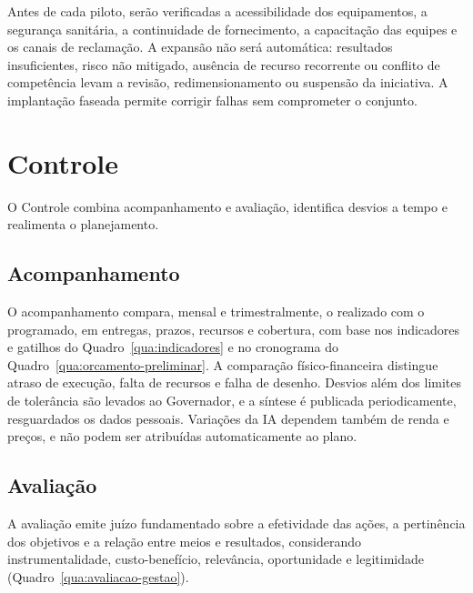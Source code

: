\documentclass[
	12pt,				%
	openright,			%
	oneside,			%
	a4paper,			%
	chapter=TITLE,		%
	section=TITLE,		%
	english,			%
	french,				%
	spanish,			%
	brazil,				%
 ]{abntex2}
\begin{document}
Antes de cada piloto, serão verificadas a acessibilidade dos equipamentos, a
segurança sanitária, a continuidade de fornecimento, a capacitação das equipes
e os canais de reclamação. A expansão não será automática: resultados
insuficientes, risco não mitigado, ausência de recurso recorrente ou conflito de
competência levam a revisão, redimensionamento ou suspensão da iniciativa. A
implantação faseada permite corrigir falhas sem comprometer o conjunto.

\section{Controle}
O Controle combina acompanhamento e avaliação, identifica desvios a tempo e
realimenta o planejamento.

\subsection{Acompanhamento}
O acompanhamento compara, mensal e trimestralmente, o realizado com o
programado, em entregas, prazos, recursos e cobertura, com base nos indicadores
e gatilhos do Quadro~\ref{qua:indicadores} e no cronograma do
Quadro~\ref{qua:orcamento-preliminar}. A comparação físico-financeira distingue
atraso de execução, falta de recursos e falha de desenho. Desvios além dos
limites de tolerância são levados ao Governador, e a síntese é publicada
periodicamente, resguardados os dados pessoais. Variações da IA dependem também
de renda e preços, e não podem ser atribuídas automaticamente ao plano.

\subsection{Avaliação}
A avaliação emite juízo fundamentado sobre a efetividade das ações, a
pertinência dos objetivos e a relação entre meios e resultados, considerando
instrumentalidade, custo-benefício, relevância, oportunidade e legitimidade
 (Quadro~\ref{qua:avaliacao-gestao}).
\end{document}

